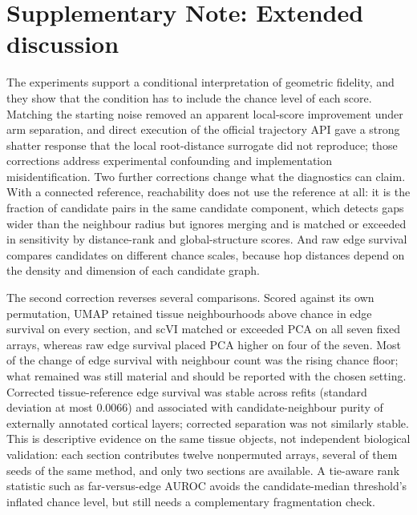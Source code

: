 \documentclass[11pt]{article}
\begin{document}
\begin{table}[!ht]
\centering\small
\caption{Edge survival against the expression PCA. The PCA column is 1 by construction. PBMC has no tissue coordinate. Values are rounded to three decimals.}
\label{tab:expression}

\end{table}

\section*{Supplementary Note: Extended discussion}

The experiments support a conditional interpretation of geometric fidelity, and they show that the condition has to include the chance level of each score. Matching the starting noise removed an apparent local-score improvement under arm separation, and direct execution of the official trajectory API gave a strong shatter response that the local root-distance surrogate did not reproduce; those corrections address experimental confounding and implementation misidentification. Two further corrections change what the diagnostics can claim. With a connected reference, reachability does not use the reference at all: it is the fraction of candidate pairs in the same candidate component, which detects gaps wider than the neighbour radius but ignores merging and is matched or exceeded in sensitivity by distance-rank and global-structure scores. And raw edge survival compares candidates on different chance scales, because hop distances depend on the density and dimension of each candidate graph.

The second correction reverses several comparisons. Scored against its own permutation, UMAP retained tissue neighbourhoods above chance in edge survival on every section, and scVI matched or exceeded PCA on all seven fixed arrays, whereas raw edge survival placed PCA higher on four of the seven. Most of the change of edge survival with neighbour count was the rising chance floor; what remained was still material and should be reported with the chosen setting. Corrected tissue-reference edge survival was stable across refits (standard deviation at most 0.0066) and associated with candidate-neighbour purity of externally annotated cortical layers; corrected separation was not similarly stable. This is descriptive evidence on the same tissue objects, not independent biological validation: each section contributes twelve nonpermuted arrays, several of them seeds of the same method, and only two sections are available. A tie-aware rank statistic such as far-versus-edge AUROC avoids the candidate-median threshold's inflated chance level, but still needs a complementary fragmentation check.
\end{document}
